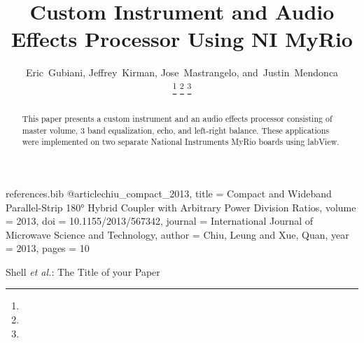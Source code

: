 \begin{filecontents*}{references.bib}
@article{chiu_compact_2013,
	title = {Compact and Wideband Parallel-Strip 180° Hybrid Coupler with Arbitrary Power Division Ratios},
	volume = {2013},
	doi = {10.1155/2013/567342},
	journal = {International Journal of Microwave Science and Technology},
	author = {Chiu, Leung and Xue, Quan},
	year = {2013},
	pages = {10}
}
\end{filecontents*}
%


%
\title{Custom Instrument and Audio Effects Processor Using NI MyRio}
%
%
%

\author{Eric~Gubiani, Jeffrey~Kirman, Jose~Mastrangelo, and~Justin~Mendonca

\thanks{ 
 }
\thanks{}%
\thanks{}%
}


\markboth{}%
{Shell \MakeLowercase{\textit{et al.}}: The Title of your Paper}
%

\maketitle

\begin{abstract}
This paper presents a custom instrument and an audio effects processor consisting of master volume, 3 band equalization, echo, and left-right balance. 
These applications were implemented on two separate National Instruments MyRio boards using labView. 
\end{abstract}

